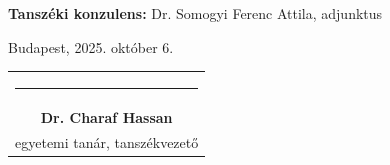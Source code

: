 \vspace{1cm}
\noindent \textbf{Tanszéki konzulens:} Dr. Somogyi Ferenc Attila, adjunktus

\vspace{1.5cm}
\noindent Budapest, 2025. október 6.

\vspace{2cm}
\begin{flushright}
    \begin{tabular}{c}
        \rule{5cm}{0.4pt} \\
        \textbf{Dr. Charaf Hassan} \\
        egyetemi tanár, tanszékvezető
    \end{tabular}
\end{flushright}